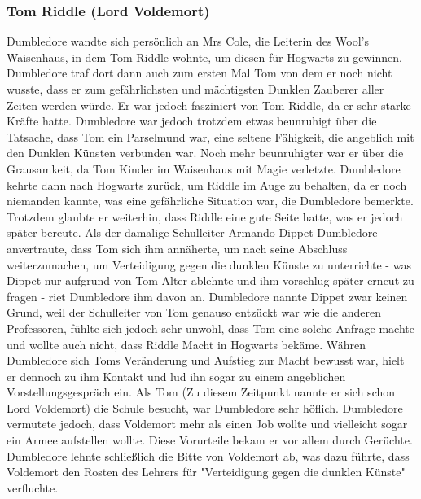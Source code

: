 \documentclass[a4paper, 10pt]{article}
\begin{document}
\subsubsection*{\large Tom Riddle (Lord Voldemort)}
Dumbledore wandte sich persönlich an Mrs Cole, die Leiterin des Wool's Waisenhaus, in dem Tom Riddle wohnte, um diesen für Hogwarts zu gewinnen. Dumbledore traf dort dann auch zum ersten Mal Tom von dem er noch nicht wusste, dass er zum gefährlichsten und mächtigsten Dunklen Zauberer aller Zeiten werden würde. Er war jedoch fasziniert von Tom Riddle, da er sehr starke Kräfte hatte. Dumbledore war jedoch trotzdem etwas beunruhigt über die Tatsache, dass Tom ein Parselmund war, eine seltene Fähigkeit, die angeblich mit den Dunklen Künsten verbunden war. Noch mehr beunruhigter war er über die Grausamkeit, da Tom Kinder im Waisenhaus mit Magie verletzte. Dumbledore kehrte dann nach Hogwarts zurück, um Riddle im Auge zu behalten, da er noch niemanden kannte, was eine gefährliche Situation war, die Dumbledore bemerkte. Trotzdem glaubte er weiterhin, dass Riddle eine gute Seite hatte, was er jedoch später bereute.
\vspace{10pt}
\newline
{}  
Als der damalige Schulleiter Armando Dippet Dumbledore anvertraute, dass Tom sich ihm annäherte, um nach seine Abschluss weiterzumachen, um Verteidigung gegen die dunklen Künste zu unterrichte - was Dippet nur aufgrund von Tom Alter ablehnte und ihm vorschlug später erneut zu fragen - riet Dumbledore ihm davon an. Dumbledore nannte Dippet zwar keinen Grund, weil der Schulleiter von Tom genauso entzückt war wie die anderen Professoren, fühlte sich jedoch sehr unwohl, dass Tom eine solche Anfrage machte und wollte auch nicht, dass Riddle Macht in Hogwarts bekäme.
\vspace{10pt}
\newline
{}  
Währen Dumbledore sich Toms Veränderung und Aufstieg zur Macht bewusst war, hielt er dennoch zu ihm Kontakt und lud ihn sogar zu einem angeblichen Vorstellungsgespräch ein. Als Tom (Zu diesem Zeitpunkt nannte er sich schon Lord Voldemort) die Schule besucht, war Dumbledore sehr höflich. Dumbledore vermutete jedoch, dass Voldemort mehr als einen Job wollte und vielleicht sogar ein Armee aufstellen wollte. Diese Vorurteile bekam er vor allem durch Gerüchte. Dumbledore lehnte schließlich die Bitte von Voldemort ab, was dazu führte, dass Voldemort den Rosten des Lehrers für "Verteidigung gegen die dunklen Künste" verfluchte.
\vspace{10pt}
\end{document}
